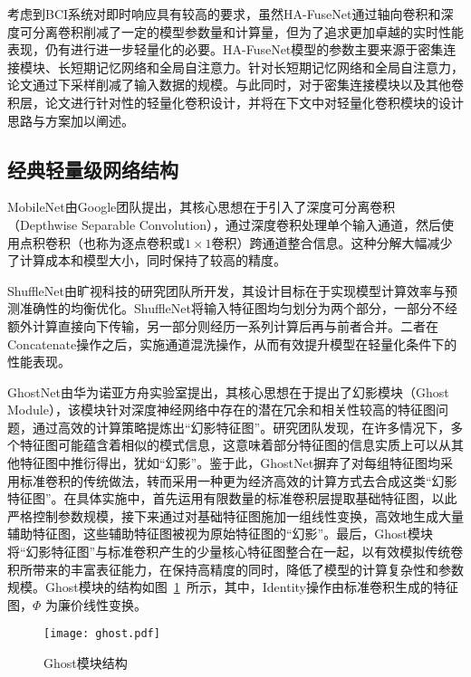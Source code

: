 考虑到BCI系统对即时响应具有较高的要求，虽然HA-FuseNet通过轴向卷积和深度可分离卷积削减了一定的模型参数量和计算量，但为了追求更加卓越的实时性能表现，仍有进行进一步轻量化的必要。HA-FuseNet模型的参数主要来源于密集连接模块、长短期记忆网络和全局自注意力。针对长短期记忆网络和全局自注意力，论文通过下采样削减了输入数据的规模。与此同时，对于密集连接模块以及其他卷积层，论文进行针对性的轻量化卷积设计，并将在下文中对轻量化卷积模块的设计思路与方案加以阐述。

\subsection{经典轻量级网络结构}

MobileNet\cite{howard2017mobilenets}由Google团队提出，其核心思想在于引入了深度可分离卷积（Depthwise Separable Convolution），通过深度卷积处理单个输入通道，然后使用点积卷积（也称为逐点卷积或\(1 \times 1\)卷积）跨通道整合信息。这种分解大幅减少了计算成本和模型大小，同时保持了较高的精度。

ShuffleNet\cite{ma2018shufflenet}由旷视科技的研究团队所开发，其设计目标在于实现模型计算效率与预测准确性的均衡优化。ShuffleNet将输入特征图均匀划分为两个部分，一部分不经额外计算直接向下传输，另一部分则经历一系列计算后再与前者合并。二者在Concatenate操作之后，实施通道混洗操作，从而有效提升模型在轻量化条件下的性能表现。

GhostNet\cite{han2020ghostnet}由华为诺亚方舟实验室提出，其核心思想在于提出了幻影模块（Ghost Module），该模块针对深度神经网络中存在的潜在冗余和相关性较高的特征图问题，通过高效的计算策略提炼出“幻影特征图”。研究团队发现，在许多情况下，多个特征图可能蕴含着相似的模式信息，这意味着部分特征图的信息实质上可以从其他特征图中推衍得出，犹如“幻影”。鉴于此，GhostNet摒弃了对每组特征图均采用标准卷积的传统做法，转而采用一种更为经济高效的计算方式去合成这类“幻影特征图”。在具体实施中，首先运用有限数量的标准卷积层提取基础特征图，以此严格控制参数规模，接下来通过对基础特征图施加一组线性变换，高效地生成大量辅助特征图，这些辅助特征图被视为原始特征图的“幻影”。最后，Ghost模块将“幻影特征图”与标准卷积产生的少量核心特征图整合在一起，以有效模拟传统卷积所带来的丰富表征能力，在保持高精度的同时，降低了模型的计算复杂性和参数规模。Ghost模块的结构如图~\ref{fig:ghost}~所示，其中，Identity操作由标准卷积生成的特征图，\(\Phi\) 为廉价线性变换。
\begin{figure}[ht]
  \centering
  \texttt{[image: ghost.pdf]}
  \caption{Ghost模块结构\cite{han2020ghostnet}}
  \label{fig:ghost}
\end{figure}

